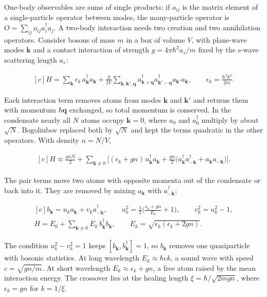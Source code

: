 \documentclass[11pt,oneside]{book}
\newenvironment{centeredalign}{\[\begin{gathered}[c]}{\end{gathered}\]}
\begin{document}
One-body observables are sums of single products: if \(o_{ij}\) is the matrix element of a single-particle operator between modes, the many-particle operator is \(O=\sum_{ij}o_{ij}a_i^\dagger a_j\). A two-body interaction needs two creation and two annihilation operators. Consider bosons of mass \(m\) in a box of volume \(V\), with plane-wave modes \(\mathbf k\) and a contact interaction of strength \(g=4\pi\hbar^2a_s/m\) fixed by the s-wave scattering length \(a_s\):

\begin{centeredalign}
H=\sum_{\mathbf k}\epsilon_k\,a_{\mathbf k}^\dagger a_{\mathbf k}
+\frac{g}{2V}\sum_{\mathbf k,\mathbf k',\mathbf q}
a_{\mathbf k+\mathbf q}^\dagger a_{\mathbf k'-\mathbf q}^\dagger a_{\mathbf k'}a_{\mathbf k},
\qquad \epsilon_k=\frac{\hbar^2k^2}{2m}.
\end{centeredalign}

Each interaction term removes atoms from modes \(\mathbf k\) and \(\mathbf k'\) and returns them with momentum \(\hbar\mathbf q\) exchanged, so total momentum is conserved. In the condensate nearly all \(N\) atoms occupy \(\mathbf k=0\), where \(a_0\) and \(a_0^\dagger\) multiply by about \(\sqrt N\). Bogoliubov replaced both by \(\sqrt N\) and kept the terms quadratic in the other operators. With density \(n=N/V\),

\begin{centeredalign}
H\approx\frac{gnN}{2}+\sum_{\mathbf k\neq0}\Big[(\epsilon_k+gn)\,a_{\mathbf k}^\dagger a_{\mathbf k}
+\frac{gn}{2}\big(a_{\mathbf k}^\dagger a_{-\mathbf k}^\dagger+a_{\mathbf k}a_{-\mathbf k}\big)\Big].
\end{centeredalign}

The pair terms move two atoms with opposite momenta out of the condensate or back into it. They are removed by mixing \(a_{\mathbf k}\) with \(a_{-\mathbf k}^\dagger\):

\begin{centeredalign}
b_{\mathbf k}=u_ka_{\mathbf k}+v_ka_{-\mathbf k}^\dagger,\qquad
u_k^2=\frac12\Big(\frac{\epsilon_k+gn}{E_k}+1\Big),\qquad v_k^2=u_k^2-1,\\
H=E_0+\sum_{\mathbf k\neq0}E_k\,b_{\mathbf k}^\dagger b_{\mathbf k},\qquad
E_k=\sqrt{\epsilon_k(\epsilon_k+2gn)}.
\end{centeredalign}

The condition \(u_k^2-v_k^2=1\) keeps \([b_{\mathbf k},b_{\mathbf k}^\dagger]=1\), so \(b_{\mathbf k}\) removes one quasiparticle with bosonic statistics. At long wavelength \(E_k\approx\hbar ck\), a sound wave with speed \(c=\sqrt{gn/m}\). At short wavelength \(E_k\approx\epsilon_k+gn\), a free atom raised by the mean interaction energy. The crossover lies at the healing length \(\xi=\hbar/\sqrt{2mgn}\), where \(\epsilon_k=gn\) for \(k=1/\xi\).
\end{document}
